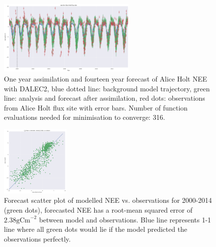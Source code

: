 \documentclass[11pt]{article}
\begin{document}
 \begin{figure}[ht]
    \centering
    \includegraphics[width=0.6\textwidth]{b_edcr_corr_cor03_tau4_cutoff4_var05_4dvar.png}
    \caption{One year assimilation and fourteen year forecast of Alice Holt NEE with DALEC2, blue dotted line: background model trajectory, green line: analysis and forecast after assimilation, red dots: observations from Alice Holt flux site with error bars. Number of function evaluations needed for minimisation to converge: 316.}
    \label{fig:4dvaredcBcorR}
\end{figure}

\begin{figure}[ht]
    \centering
    \includegraphics[width=0.3\textwidth]{b_edcr_corr_cor03_tau4_cutoff4_var05_forecast_scatter.png}
    \caption{Forecast scatter plot of modelled NEE vs. observations for 2000-2014 (green dots), forecasted NEE has a root-mean squared error of $2.38 \text{gCm}^{-2}$ between model and observations. Blue line represents 1-1 line where all green dots would lie if the model predicted the observations perfectly.}
    \label{fig:forecastscatedcBcorR}
\end{figure}
\end{document}
